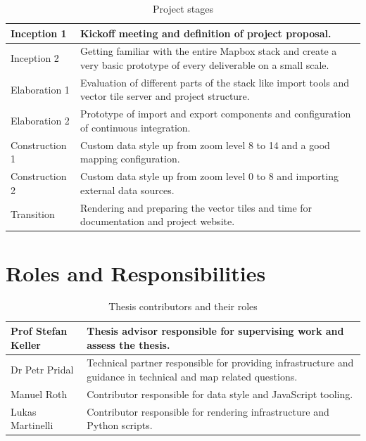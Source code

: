 \begin{table}[H]
\centering
    \begin{tabular}{p{2.5cm} p{10cm}}
	Inception 1 & Kickoff meeting and
  definition of project proposal. \\ \hline

	Inception 2 & Getting familiar with the entire Mapbox stack and create a very basic prototype of every deliverable on a small scale. \\ \hline

	Elaboration 1 & Evaluation of different parts of the
  stack like import tools and vector tile server and project structure. \\ \hline
  Elaboration 2  & Prototype of import and export components and configuration of continuous integration.
\\ \hline

  Construction 1 & Custom data style up from zoom level 8 to 14 and a good mapping configuration.\\ \hline
  Construction 2 & Custom data style up from zoom level 0 to 8 and importing external data sources. \\ \hline
  Transition & Rendering and preparing the vector tiles and time for documentation and project website.\\ \hline
    \end{tabular}
    \caption{Project stages}
\end{table}

\section{Roles and Responsibilities}\label{roles-and-responsibilities}

\begin{table}[H]
\centering
    \begin{tabular}{p{3cm} p{9.5cm}}
Prof Stefan Keller & Thesis advisor responsible for supervising work and
assess the thesis.\\ \hline
Dr Petr Pridal &
Technical partner responsible for providing infrastructure and guidance in technical and map related questions.\\ \hline
Manuel Roth &
Contributor responsible for data style and JavaScript tooling.\\ \hline
Lukas Martinelli &
Contributor responsible for rendering infrastructure and Python scripts.\\ \hline
    \end{tabular}
    \caption{Thesis contributors and their roles}
\end{table}

